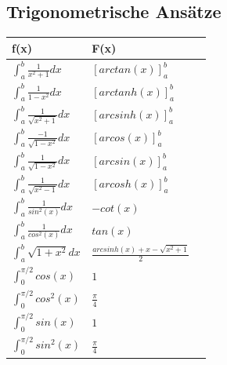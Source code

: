 \documentclass[a4paper,8pt]{extarticle}
\renewcommand*{\arraystretch}{2}
\begin{document}
\subsection{Trigonometrische Ansätze}
\begin{center}
\def\arraystretch{2}
\begin{tabularx}{0.321\textwidth}{ |>{\centering\arraybackslash}X|>{\centering\arraybackslash}X|>{\centering
\arraybackslash}X| }
 \hline
 \textbf{f(x)} & \textbf{F(x)} \\
 \hline
 $\int_a^b \frac{1}{x^2+1}dx$ & $[arctan(x)]_a^b $\\
 \hline
 $\int_a^b \frac{1}{1-x^2}dx$ & $[arctanh(x)]_a^b $\\
 \hline
 $\int_a^b \frac{1}{\sqrt{x^2+1}}dx$ & $[arcsinh(x)]_a^b $\\
 \hline
 $\int_a^b \frac{-1}{\sqrt{1-x^2}}dx$ & $[arcos(x)]_a^b $\\
 \hline
  $\int_a^b \frac{1}{\sqrt{1-x^2}}dx$ & $[arcsin(x)]_a^b $\\
 \hline
 $\int_a^b \frac{1}{\sqrt{x^2-1}}dx$ & $[arcosh(x)]_a^b $\\
  \hline
 $\int_a^b \frac{1}{sin^2(x)}dx$ & $-cot(x) $\\
   \hline
 $\int_a^b \frac{1}{cos^2(x)}dx$ & $tan(x) $\\
   \hline
 $\int_a^b \sqrt{1+x^2}dx$ & $\frac{arcsinh(x)+x - \sqrt{x^2+1}}{2} $\\
  \hline
   $\int_0^{\pi/2} cos(x)$ & $1$\\
  \hline
     $\int_0^{\pi/2} cos^2(x)$ & $\frac{\pi}{4}$\\
  \hline
     $\int_0^{\pi/2} sin(x)$ & $1$\\
  \hline
     $\int_0^{\pi/2} sin^2(x)$ & $\frac{\pi}{4}$\\
  \hline
 \end{tabularx}
\end{center}
\end{document}
